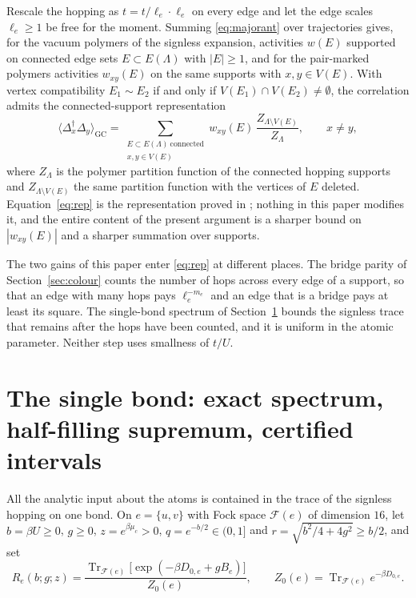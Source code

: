 \documentclass[11pt]{article}
\theoremstyle{plain}
\theoremstyle{definition}
\DeclareMathOperator{\Tr}{Tr}
\newcommand{\Dop}{\Delta}
\begin{document}
Rescale the hopping as $t=t/\ell_e\cdot\ell_e$ on every edge and let the edge scales
$\ell_e\ge1$ be free for the moment. Summing \eqref{eq:majorant} over trajectories
gives, for the vacuum polymers of the signless expansion, activities $w(E)$ supported
on connected edge sets $E\subset E(\Lambda)$ with $|E|\ge1$, and for the pair-marked
polymers activities $w_{xy}(E)$ on the same supports with $x,y\in V(E)$. With vertex
compatibility $E_1\sim E_2$ if and only if $V(E_1)\cap V(E_2)\ne\emptyset$, the
correlation admits the connected-support representation
\begin{equation}\label{eq:rep}
\langle\Dop_x^\dagger\Dop_y\rangle_{\mathrm{GC}}
=\sum_{\substack{E\subset E(\Lambda)\ \text{connected}\\ x,y\in V(E)}}
w_{xy}(E)\,\frac{Z_{\Lambda\setminus V(E)}}{Z_\Lambda},
\qquad x\ne y,
\end{equation}
where $Z_\Lambda$ is the polymer partition function of the connected hopping supports
and $Z_{\Lambda\setminus V(E)}$ the same partition function with the vertices of
$E$ deleted. Equation~\eqref{eq:rep} is the representation proved in
\cite[Section 5]{rens2026a}; nothing in this paper modifies it, and the entire content of
the present argument is a sharper bound on $|w_{xy}(E)|$ and a sharper summation over
supports.

The two gains of this paper enter \eqref{eq:rep} at different places. The bridge
parity of Section~\ref{sec:colour} counts the number of hops across every edge of a
support, so that an edge with many hops pays $\ell_e^{-m_e}$ and an edge that is a
bridge pays at least its square. The single-bond spectrum of Section~\ref{sec:bond}
bounds the signless trace that remains after the hops have been counted, and it is
uniform in the atomic parameter. Neither step uses smallness of $t/U$.

\section{The single bond: exact spectrum, half-filling supremum, certified
intervals}\label{sec:bond}

All the analytic input about the atoms is contained in the trace of the signless
hopping on one bond. On $e=\{u,v\}$ with Fock space $\mathcal{F}(e)$ of dimension
$16$, let $b=\beta U\ge0$, $g\ge0$, $z=e^{\beta\mu_c}>0$,
$q=e^{-b/2}\in(0,1]$ and $r=\sqrt{b^{2}/4+4g^{2}}\ge b/2$, and set
\begin{equation}\label{eq:Re}
R_e(b;g;z)=\frac{\Tr_{\mathcal{F}(e)}\bigl[
\exp(-\beta D_{0,e}+gB_e)\bigr]}{Z_0(e)},\qquad
Z_0(e)=\Tr_{\mathcal{F}(e)}e^{-\beta D_{0,e}} .
\end{equation}
\end{document}
